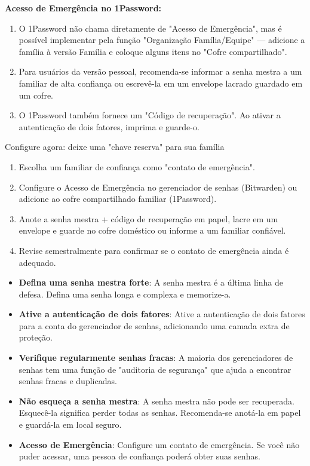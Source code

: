 \textbf{Acesso de Emergência no 1Password:}

\begin{enumerate}
  \item O 1Password não chama diretamente de "Acesso de Emergência", mas é possível implementar pela função "Organização Família/Equipe" — adicione a família à versão Família e coloque alguns itens no "Cofre compartilhado".
  \item Para usuários da versão pessoal, recomenda-se informar a senha mestra a um familiar de alta confiança ou escrevê-la em um envelope lacrado guardado em um cofre.
  \item O 1Password também fornece um "Código de recuperação". Ao ativar a autenticação de dois fatores, imprima e guarde-o.
\end{enumerate}

\begin{tcbpractice}{Configure agora: deixe uma "chave reserva" para sua família}
\begin{enumerate}
  \item Escolha um familiar de confiança como "contato de emergência".
  \item Configure o Acesso de Emergência no gerenciador de senhas (Bitwarden) ou adicione ao cofre compartilhado familiar (1Password).
  \item Anote a senha mestra + código de recuperação em papel, lacre em um envelope e guarde no cofre doméstico ou informe a um familiar confiável.
  \item Revise semestralmente para confirmar se o contato de emergência ainda é adequado.
\end{enumerate}

\end{tcbpractice}


\begin{itemize}
  \item \textbf{Defina uma senha mestra forte}: A senha mestra é a última linha de defesa. Defina uma senha longa e complexa e memorize-a.
  \item \textbf{Ative a autenticação de dois fatores}: Ative a autenticação de dois fatores para a conta do gerenciador de senhas, adicionando uma camada extra de proteção.
  \item \textbf{Verifique regularmente senhas fracas}: A maioria dos gerenciadores de senhas tem uma função de "auditoria de segurança" que ajuda a encontrar senhas fracas e duplicadas.
  \item \textbf{Não esqueça a senha mestra}: A senha mestra não pode ser recuperada. Esquecê-la significa perder todas as senhas. Recomenda-se anotá-la em papel e guardá-la em local seguro.
  \item \textbf{Acesso de Emergência}: Configure um contato de emergência. Se você não puder acessar, uma pessoa de confiança poderá obter suas senhas.
\end{itemize}

